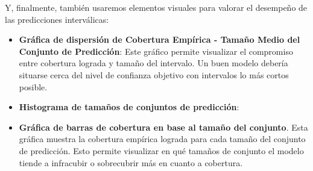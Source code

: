 Y, finalmente, también usaremos elementos visuales para valorar el desempeño de las predicciones interválicas:

\begin{itemize}

    \item \textbf{Gráfica de dispersión de Cobertura Empírica - Tamaño Medio del Conjunto de Predicción}: Este gráfico permite visualizar el compromiso entre cobertura lograda y tamaño del intervalo. Un buen modelo debería situarse cerca del nivel de confianza objetivo con intervalos lo más cortos posible. 

    \item \textbf{Histograma de tamaños de conjuntos de predicción}: 

    \item  \textbf{Gráfica de barras de cobertura en base al tamaño del conjunto}. Esta gráfica muestra la cobertura empírica lograda para cada tamaño del conjunto de predicción. Esto permite visualizar en qué tamaños de conjunto el modelo tiende a infracubir o sobrecubrir más en cuanto a cobertura.

\end{itemize}

